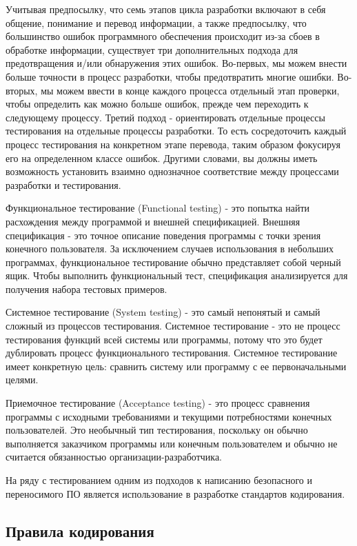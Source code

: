 Учитывая предпосылку, что семь этапов цикла разработки включают в себя общение, понимание и 
перевод информации, а также предпосылку, что большинство ошибок программного обеспечения 
происходит из-за сбоев в обработке информации, существует три дополнительных подхода для 
предотвращения и/или обнаружения этих ошибок. Во-первых, мы можем внести больше точности в 
процесс разработки, чтобы предотвратить многие ошибки. Во-вторых, мы можем ввести в конце 
каждого процесса отдельный этап проверки, чтобы определить как можно больше ошибок, прежде чем 
переходить к следующему процессу. Третий подход - ориентировать отдельные процессы 
тестирования на отдельные процессы разработки. То есть сосредоточить каждый процесс 
тестирования на конкретном этапе перевода, таким образом фокусируя его на определенном классе ошибок. %
Другими словами, вы должны иметь возможность установить взаимно однозначное соответствие между процессами разработки и тестирования.

Функциональное тестирование (Functional testing) - это попытка найти расхождения между 
программой и внешней спецификацией. Внешняя спецификация - это точное описание поведения 
программы с точки зрения конечного пользователя. За исключением случаев использования в 
небольших программах, функциональное тестирование обычно представляет собой черный ящик.
Чтобы выполнить функциональный тест, спецификация анализируется для получения набора тестовых 
примеров.

Системное тестирование (System testing) - это самый непонятый и самый сложный из процессов 
тестирования. Системное тестирование - это не процесс тестирования функций всей системы или 
программы, потому что это будет дублировать процесс функционального тестирования. Системное 
тестирование имеет конкретную цель: сравнить систему или программу с ее первоначальными 
целями.

Приемочное тестирование (Acceptance testing) - это процесс сравнения программы с исходными требованиями 
и текущими потребностями конечных пользователей. Это необычный тип тестирования, поскольку он обычно 
выполняется заказчиком программы или конечным пользователем и обычно не считается обязанностью 
организации-разработчика.

На ряду с тестированием одним из подходов к написанию безопасного и переносимого ПО 
является использование в разработке стандартов кодирования. 

\subsection{Правила кодирования}

